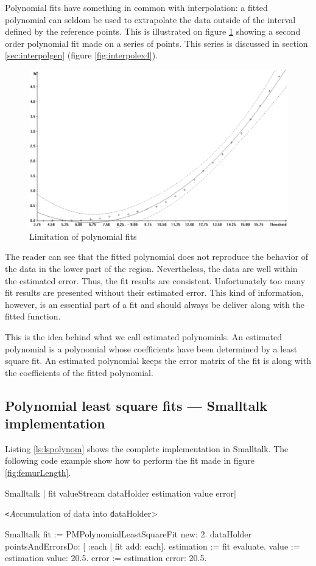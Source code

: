 Polynomial fits have something in common with interpolation: a
fitted polynomial can seldom be used to extrapolate the data
outside of the interval defined by the reference points. This is
illustrated on figure \ref{fig:polFitLimit} showing a second order
polynomial fit made on a series of points. This series is
discussed in section \ref{sec:interpolgen} (figure
\ref{fig:interpolex4}).
\begin{figure}
\centering\includegraphics[width=12cm]{Figures/PolFitLimit}
\caption{Limitation of polynomial fits}\label{fig:polFitLimit}
\end{figure}
The reader can see that the fitted polynomial does not reproduce
the behavior of the data in the lower part of the region.
Nevertheless, the data are well within the estimated error. Thus,
the fit results are consistent. Unfortunately too many fit results
are presented without their estimated error. This kind of
information, however, is an essential part of a fit and should
always be deliver along with the fitted function.

This is the idea behind what we call estimated polynomials. An
estimated polynomial is a polynomial whose coefficients have been
determined by a least square fit. An estimated polynomial keeps
the error matrix of the fit is along with the coefficients of the
fitted polynomial.

\subsection{Polynomial least square fits --- Smalltalk  implementation}
\label{sec:slsfpol} Listing \ref{ls:lspolynom} shows the complete
implementation in Smalltalk. The following code example show how
to perform the fit made in figure \ref{fig:femurLength}.
\begin{displaycode}{Smalltalk}
 | fit valueStream dataHolder estimation value error|
\end{displaycode}
 \hfil {\texttt<\textsl Accumulation of data into \texttt dataHolder>}
\begin{displaycode}{Smalltalk}
 fit := PMPolynomialLeastSquareFit new: 2.
 dataHolder pointsAndErrorsDo: [ :each | fit add: each].
 estimation := fit evaluate.
 value := estimation value: 20.5.
 error := estimation error: 20.5.
\end{displaycode}

